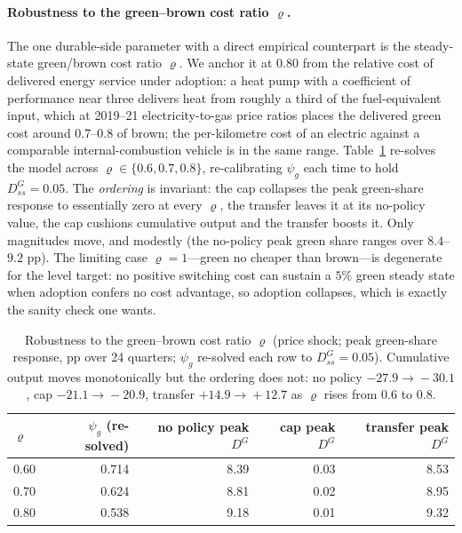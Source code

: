 \documentclass[11pt,a4paper]{article}
\begin{document}
\paragraph{Robustness to the green--brown cost ratio $\varrho$.} The one
durable-side parameter with a direct empirical counterpart is the steady-state
green/brown cost ratio $\varrho$. We anchor it at $0.80$ from the relative cost
of delivered energy service under adoption: a heat pump with a coefficient of
performance near three delivers heat from roughly a third of the fuel-equivalent
input, which at 2019--21 electricity-to-gas price ratios places the delivered
green cost around $0.7$--$0.8$ of brown; the per-kilometre cost of an electric
against a comparable internal-combustion vehicle is in the same range.
Table~\ref{tab:rho} re-solves the model across $\varrho\in\{0.6,0.7,0.8\}$,
re-calibrating $\psi_g$ each time to hold $D^{G}_{ss}=0.05$. The \emph{ordering}
is invariant: the cap collapses the peak green-share response to essentially
zero at every $\varrho$, the transfer leaves it at its no-policy value, the cap
cushions cumulative output and the transfer boosts it. Only magnitudes move, and
modestly (the no-policy peak green share ranges over $8.4$--$9.2$ pp). The
limiting case $\varrho=1$---green no cheaper than brown---is degenerate for the
level target: no positive switching cost can sustain a $5\%$ green steady state
when adoption confers no cost advantage, so adoption collapses, which is exactly
the sanity check one wants.

\begin{table}[H]\centering\small
\begin{tabular}{lrrrr}
\toprule
$\varrho$ & $\psi_g$ (re-solved) & no policy peak $D^{G}$ & cap peak $D^{G}$ & transfer peak $D^{G}$\\
\midrule
0.60 & 0.714 & 8.39 & 0.03 & 8.53\\
0.70 & 0.624 & 8.81 & 0.02 & 8.95\\
0.80 & 0.538 & 9.18 & 0.01 & 9.32\\
\bottomrule
\end{tabular}
\caption{Robustness to the green--brown cost ratio $\varrho$ (price shock; peak
green-share response, pp over 24 quarters; $\psi_g$ re-solved each row to
$D^{G}_{ss}=0.05$). Cumulative output moves monotonically but the ordering does
not: no policy $-27.9\!\to\!-30.1$, cap $-21.1\!\to\!-20.9$, transfer
$+14.9\!\to\!+12.7$ as $\varrho$ rises from $0.6$ to $0.8$.}
\label{tab:rho}
\end{table}
\end{document}

